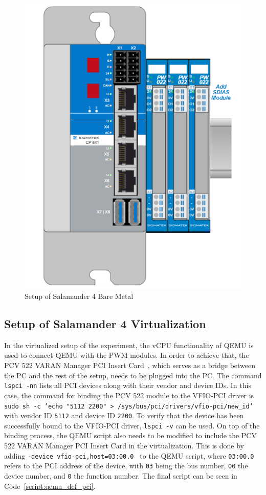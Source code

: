 \documentclass[MMR,Master,english]{style/twbook}
\begin{document}
\begin{figure}[H]
	\centering
	\includegraphics[width=0.45\columnwidth]{img/experiment/hardware_tree.png}
	\caption[Setup of Salamander 4 Bare Metal]{Setup of Salamander 4 Bare Metal}
	\label{fig:hardware_tree}
\end{figure}

\subsection{Setup of Salamander 4 Virtualization}\label{subsec:setup_experiment_virtualized}
In the virtualized setup of the experiment, the vCPU functionality of QEMU is used to connect QEMU with the PWM modules. In order to achieve that, the PCV 522 VARAN Manager PCI Insert Card~\cite{ControlsHMIsSIGMATEK}, which serves as a bridge between the PC and the rest of the setup, needs to be plugged into the PC. The command \texttt{lspci -nn} lists all PCI devices along with their vendor and device IDs. In this case, the command for binding the PCV 522 module to the VFIO-PCI driver is \texttt{sudo sh -c 'echo "5112 2200" > /sys/bus/pci/drivers/vfio-pci/new\_id'} with vendor ID \texttt{5112} and device ID \texttt{2200}.  To verify that the device has been successfully bound to the VFIO-PCI driver, \texttt{lspci -v} can be used. On top of the binding process, the QEMU script also needs to be modified to include the PCV 522 VARAN Manager PCI Insert Card in the virtualization. This is done by adding \texttt{-device\ vfio-pci,host=03:00.0 } to the QEMU script, where \texttt{03:00.0} refers to the PCI address of the device, with \texttt{03} being the bus number, \texttt{00} the device number, and \texttt{0} the function number. The final script can be seen in Code~\ref{script:qemu_def_pci}.

\clearpage
\end{document}
